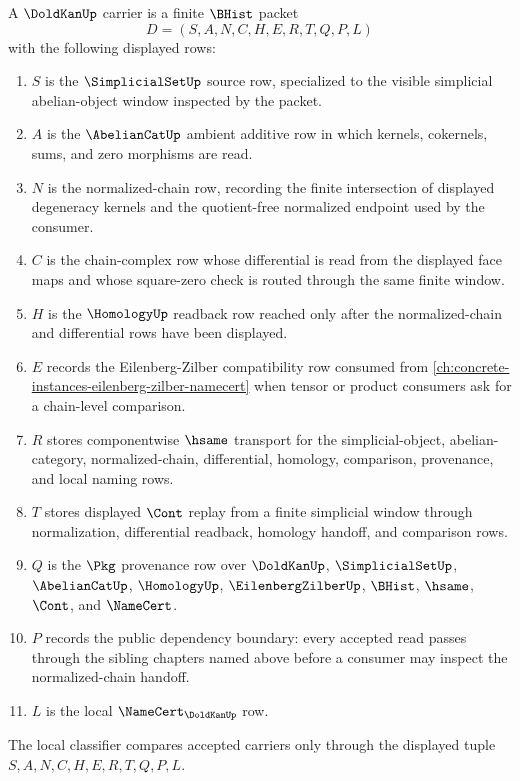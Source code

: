 \begin{definition}
\label{def:dold-kan-carrier}
A $\DoldKanUp$ carrier is a finite $\BHist$ packet
$$
D=(S,A,N,C,H,E,R,T,Q,P,L)
$$
with the following displayed rows:
\begin{enumerate}
\item $S$ is the $\SimplicialSetUp$ source row, specialized to the visible simplicial abelian-object window inspected by the packet.
\item $A$ is the $\AbelianCatUp$ ambient additive row in which kernels, cokernels, sums, and zero morphisms are read.
\item $N$ is the normalized-chain row, recording the finite intersection of displayed degeneracy kernels and the quotient-free normalized endpoint used by the consumer.
\item $C$ is the chain-complex row whose differential is read from the displayed face maps and whose square-zero check is routed through the same finite window.
\item $H$ is the $\HomologyUp$ readback row reached only after the normalized-chain and differential rows have been displayed.
\item $E$ records the Eilenberg-Zilber compatibility row consumed from \autoref{ch:concrete-instances-eilenberg-zilber-namecert} when tensor or product consumers ask for a chain-level comparison.
\item $R$ stores componentwise $\hsame$ transport for the simplicial-object, abelian-category, normalized-chain, differential, homology, comparison, provenance, and local naming rows.
\item $T$ stores displayed $\Cont$ replay from a finite simplicial window through normalization, differential readback, homology handoff, and comparison rows.
\item $Q$ is the $\Pkg$ provenance row over $\DoldKanUp$, $\SimplicialSetUp$, $\AbelianCatUp$, $\HomologyUp$, $\EilenbergZilberUp$, $\BHist$, $\hsame$, $\Cont$, and $\NameCert$.
\item $P$ records the public dependency boundary: every accepted read passes through the sibling chapters named above before a consumer may inspect the normalized-chain handoff.
\item $L$ is the local $\NameCert_{\DoldKanUp}$ row.
\end{enumerate}
The local classifier compares accepted carriers only through the displayed tuple $S,A,N,C,H,E,R,T,Q,P,L$.
\end{definition}

